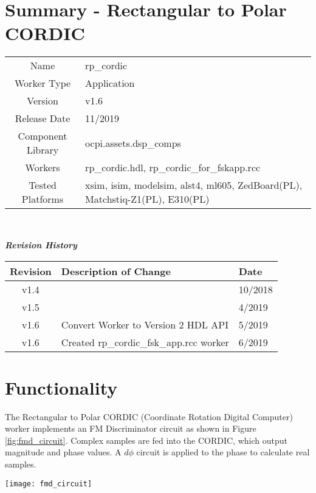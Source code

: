 \documentclass{article}
\author{} %
\date{Version \docVersion} %
\title{\docTitle}
\def\docVersion{1.6}
\def\comp{rp\_cordic}
\def\rcc_comp{rp\_cordic\_for\_fskapp}
\def\Comp{Rectangular to Polar CORDIC}
\begin{document}
\section*{Summary - \Comp}
\begin{tabular}{|c|M{13.5cm}|}
	\hline
	                  &                                                    \\
	\hline
	Name              & \comp                    \\
	\hline
	Worker Type       & Application                                        \\
	\hline
	Version           & v\docVersion \\
	\hline
	Release Date      & 11/2019 \\
	\hline
	Component Library & ocpi.assets.dsp\_comps                              \\
	\hline
	Workers           & \comp.hdl, \rcc_comp.rcc                            \\
	\hline
	Tested Platforms  & xsim, isim, modelsim, alst4, ml605, ZedBoard(PL), Matchstiq-Z1(PL), E310(PL)\\
	\hline
\end{tabular}\\ \bigskip

\begin{center}
	\textit{\textbf{Revision History}}
	\begin{table}[H]
	\label{table:revisions} %
		\begin{tabularx}{\textwidth}{|c|X|l|}
		\hline
		\rowcolor{blue}
		\textbf{Revision} & \textbf{Description of Change} & \textbf{Date} \\
		\hline
		v1.4 & & 10/2018 \\
		\hline
		v1.5 & & 4/2019 \\
		\hline
		v1.6 & Convert Worker to Version 2 HDL API & 5/2019 \\
		\hline
		v1.6 & Created rp\_cordic\_fsk\_app.rcc worker &  6/2019 \\
		\hline
		\end{tabularx}
	\end{table}
\end{center}

\section*{Functionality}
\begin{flushleft}
	The Rectangular to Polar CORDIC (Coordinate Rotation Digital Computer) worker implements an FM Discriminator circuit as shown in Figure \ref{fig:fmd_circuit}. Complex samples are fed into the CORDIC, which output magnitude and phase values. A $d\phi$ circuit is applied to the phase to calculate real samples.
\end{flushleft}
{\centering\captionsetup{type=figure}\texttt{[image: fmd\_circuit]}\par{}\label{fig:fmd_circuit}}
\end{document}
